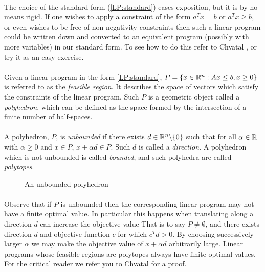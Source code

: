 \paragraph{}The choice of the standard form (\ref{LP:standard}) eases exposition, but it is by no means rigid. If one wishes to apply a constraint of the form $a^T x = b$ or $a^T x \geq b$, or even wishes to be free of non-negativity constraints then such a linear program could be written down and converted to an equivalent program (possibly with more variables) in our standard form. To see how to do this refer to Chvatal \cite{chvatal1983linear}, or try it as an easy exercise.

\paragraph{} Given a linear program in the form \ref{LP:standard}, $P = \{ x \in \mathbb{R}^n: Ax \leq b, x \geq 0 \}$ is referred to as the {\it feasible region}. It describes the space of vectors which satisfy the constraints of the linear program. Such $P$ is a geometric object called a {\it polyhedron}, which can be defined as the space formed by the intersection of a finite number of half-spaces.

\paragraph{}
 A polyhedron, $P$, is {\it unbounded} if there exists $d \in \mathbb{R}^n\backslash \{0\}$ such that for all $\alpha \in \mathbb{R}$ with $\alpha \geq 0$ and $x \in P$, $x + \alpha d \in P$. Such $d$ is called a {\it direction}. A polyhedron which is not unbounded is called {\it bounded}, and such polyhedra are called {\it polytopes}.

\begin{figure}
\centering
{}
\caption{An unbounded polyhedron}
\end{figure}

\paragraph{}Observe that if $P$ is unbounded then the corresponding linear program may not have a finite optimal value. In particular this happens when translating along a direction $d$ can increase the objective value That is to say $P \neq \emptyset$, and there exists direction $d$ and objective function $c$ for which $c^Td >0$. By choosing successively larger $\alpha$ we may make the objective value of $x + \alpha d$ arbitrarily large. Linear programs whose feasible regions are polytopes always have finite optimal values. For the critical reader we refer you to Chvatal \cite{chvatal1983linear} for a proof.

